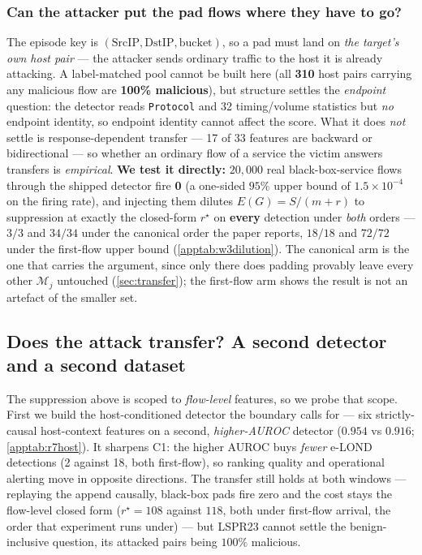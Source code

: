 \documentclass[conference]{IEEEtran}
\begin{document}
\subsubsection*{Can the attacker put the pad flows where they have to go?}

The episode key is $(\mathrm{SrcIP}, \mathrm{DstIP}, \text{bucket})$, so a pad must land on \emph{the
target's own host pair} --- the attacker sends ordinary traffic to the host it is already attacking.
A label-matched pool cannot be built here (all \textbf{310} host pairs carrying any malicious flow are
\textbf{100\% malicious}), but structure settles the \emph{endpoint} question: the detector reads
\texttt{Protocol} and 32 timing/volume statistics but \emph{no} endpoint identity, so endpoint identity
cannot affect the score. What it does \emph{not} settle is response-dependent transfer --- 17 of 33
features are backward or bidirectional --- so whether an ordinary flow of a service the victim answers
transfers is \emph{empirical}. \textbf{We test it directly:} $20{,}000$ real black-box-service flows
through the shipped detector fire \textbf{0} (a one-sided $95\%$ upper bound of $1.5\times10^{-4}$ on
the firing rate), and injecting them dilutes $E(G)=S/(m+r)$ to suppression at exactly the closed-form
$r^{\star}$ on \textbf{every} detection under \emph{both} orders --- $3/3$ and $34/34$ under the
canonical order the paper reports, $18/18$ and $72/72$ under the first-flow upper bound
(\cref{apptab:w3dilution}). The canonical arm is the one that carries the argument, since only there
does padding provably leave every other $\mathcal{M}_j$ untouched (\cref{sec:transfer}); the
first-flow arm shows the result is not an artefact of the smaller set.

\subsection{Does the attack transfer? A second detector and a second dataset}\label{sec:transferattack}

The suppression above is scoped to \emph{flow-level} features, so we probe that scope. First we build
the host-conditioned detector the boundary calls for --- six strictly-causal host-context features on a
second, \emph{higher-AUROC} detector ($0.954$ vs $0.916$; \cref{apptab:r7host}). It sharpens C1: the
higher AUROC buys \emph{fewer} e-LOND detections (2 against 18, both first-flow), so ranking quality and operational
alerting move in opposite directions. The transfer still holds at both windows --- replaying the append
causally, black-box pads fire zero and the cost stays the flow-level closed form ($r^{\star}=108$ against
$118$, both under first-flow arrival, the order that experiment runs under) --- but LSPR23 cannot settle the benign-inclusive question, its attacked pairs being $100\%$
malicious.
\end{document}
